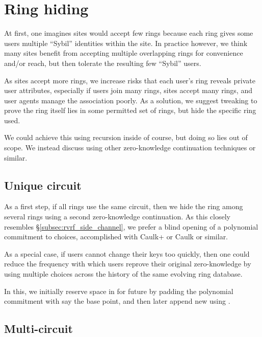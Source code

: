 \section{Ring hiding}%
\label{sec:ring_hiding}

At first, one imagines sites would accept few rings because each ring
gives some users multiple ``Sybil'' identities within the site.
In practice however, we think many sites benefit from accepting
multiple overlapping rings for convenience and/or reach, but then
tolerate the resulting few ``Sybil'' users.

As sites accept more rings, we increase risks that each user's ring
\ctx reveals private user attributes, especially if
 users join many rings, sites accept many rings, and
 user agents manage the association poorly.
As a solution, we suggest tweaking \pifast to prove the ring itself
lies in some permitted set of rings, but hide the specific ring used.

We could achieve this using recursion inside \pifast of course,
but doing so lies out of scope.  We instead discuss using other
zero-knowledge continuation techniques or similar.


\subsection{Unique circuit}

As a first step, if all rings use the same circuit, then we hide the
ring among several rings using a second zero-knowledge continuation.
As this closely resembles \S\ref{subsec:rvrf_side_channel}, we prefer
a blind opening of a polynomial commitment \cite{KZG} to \comring choices,
accomplished with Caulk+ \cite{caulk+} or Caulk \cite{caulk} or similar.

As a special case, if users cannot change their keys too quickly, then
one could reduce the frequency with which users reprove their original
zero-knowledge by using multiple \comring choices across the history
of the same evolving ring database.

In this, we initially reserve space in for future \comring by padding
the polynomial commitment with say the base point, and then later
append new \comring using \cite{aSVC}.


\subsection{Multi-circuit}

